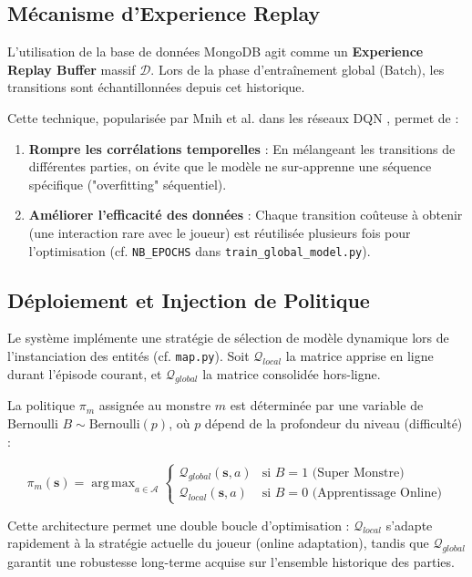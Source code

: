 \documentclass[12pt,a4paper]{article}
\newcommand{\state}{\mathbf{s}}
\newcommand{\action}{a}
\DeclareMathOperator*{\argmax}{arg\,max}
\begin{document}
\subsection{Mécanisme d'Experience Replay}
L'utilisation de la base de données MongoDB agit comme un \textbf{Experience Replay Buffer} massif $\mathcal{D}$. Lors de la phase d'entraînement global (Batch), les transitions sont échantillonnées depuis cet historique.

Cette technique, popularisée par Mnih et al. dans les réseaux DQN \cite{mnih2015human}, permet de :
\begin{enumerate}
    \item \textbf{Rompre les corrélations temporelles} : En mélangeant les transitions de différentes parties, on évite que le modèle ne sur-apprenne une séquence spécifique ("overfitting" séquentiel).
    \item \textbf{Améliorer l'efficacité des données} : Chaque transition coûteuse à obtenir (une interaction rare avec le joueur) est réutilisée plusieurs fois pour l'optimisation (cf. \texttt{NB\_EPOCHS} dans \texttt{train\_global\_model.py}).
\end{enumerate}

\subsection{Déploiement et Injection de Politique}
Le système implémente une stratégie de sélection de modèle dynamique lors de l'instanciation des entités (cf. \texttt{map.py}). Soit $\mathcal{Q}_{local}$ la matrice apprise en ligne durant l'épisode courant, et $\mathcal{Q}_{global}$ la matrice consolidée hors-ligne.

La politique $\pi_m$ assignée au monstre $m$ est déterminée par une variable de Bernoulli $B \sim \text{Bernoulli}(p)$, où $p$ dépend de la profondeur du niveau (difficulté) :

\begin{equation}
    \pi_m(\state) = \argmax_{\action \in \mathcal{A}} \begin{cases} 
    \mathcal{Q}_{global}(\state, \action) & \text{si } B=1 \text{ (Super Monstre)} \\
    \mathcal{Q}_{local}(\state, \action) & \text{si } B=0 \text{ (Apprentissage Online)}
    \end{cases}
\end{equation}

Cette architecture permet une double boucle d'optimisation : $\mathcal{Q}_{local}$ s'adapte rapidement à la stratégie actuelle du joueur (online adaptation), tandis que $\mathcal{Q}_{global}$ garantit une robustesse long-terme acquise sur l'ensemble historique des parties.
\end{document}
